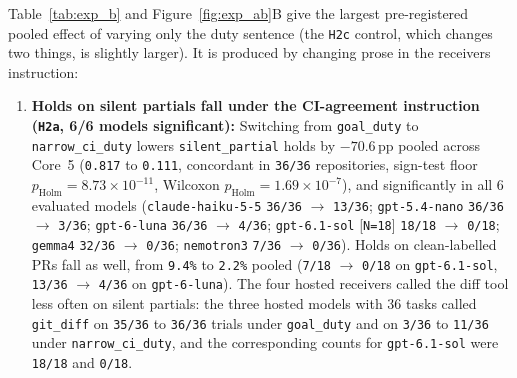 \documentclass[11pt]{article}
\begin{document}
Table~\ref{tab:exp_b} and Figure~\ref{fig:exp_ab}B give the largest pre-registered pooled effect of varying only the duty sentence (the \texttt{H2c} control, which changes two things, is slightly larger). It is produced by changing prose in the receiver\textquotesingle s instruction:
\begin{enumerate}[leftmargin=1.4em]
\item \textbf{Holds on silent partials fall under the CI-agreement instruction (\texttt{H2a}, 6/6 models significant):} Switching from \texttt{goal\_duty} to \texttt{narrow\_ci\_duty} lowers \texttt{silent\_partial} holds by \(-70.6\)\,pp pooled across Core~5 (\texttt{0.817} to \texttt{0.111}, concordant in \texttt{36/36} repositories, sign-test floor \(p_{\mathrm{Holm}} = 8.73 \times 10^{-11}\), Wilcoxon \(p_{\mathrm{Holm}} = 1.69 \times 10^{-7}\)), and significantly in all 6 evaluated models (\texttt{claude-haiku-5-5} \texttt{36/36} $\to$ \texttt{13/36}; \texttt{gpt-5.4-nano} \texttt{36/36} $\to$ \texttt{3/36}; \texttt{gpt-6-luna} \texttt{36/36} $\to$ \texttt{4/36}; \texttt{gpt-6.1-sol} [\texttt{N=18}] \texttt{18/18} $\to$ \texttt{0/18}; \texttt{gemma4} \texttt{32/36} $\to$ \texttt{0/36}; \texttt{nemotron3} \texttt{7/36} $\to$ \texttt{0/36}). Holds on clean-labelled PRs fall as well, from \texttt{9.4\%} to \texttt{2.2\%} pooled (\texttt{7/18} $\to$ \texttt{0/18} on \texttt{gpt-6.1-sol}, \texttt{13/36} $\to$ \texttt{4/36} on \texttt{gpt-6-luna}). The four hosted receivers called the diff tool less often on silent partials: the three hosted models with 36 tasks called \texttt{git\_diff} on \texttt{35/36} to \texttt{36/36} trials under \texttt{goal\_duty} and on \texttt{3/36} to \texttt{11/36} under \texttt{narrow\_ci\_duty}, and the corresponding counts for \texttt{gpt-6.1-sol} were \texttt{18/18} and \texttt{0/18}.

\end{enumerate}
\end{document}

